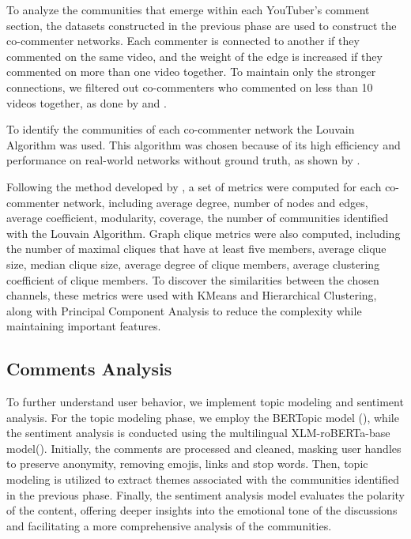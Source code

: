 \documentclass[12pt]{article}
\begin{document}
To analyze the communities that emerge within each YouTuber's comment section, the datasets constructed 
in the previous phase are used to construct the co-commenter networks. Each commenter is connected to
another if they commented on the same video, and the weight of the edge is increased if they commented
on more than one video together. To maintain only the stronger connections, we filtered out co-commenters
who commented on less than 10 videos together, as done by \cite{shajari2023} and \cite{kirdemir2023}. 

To identify the communities of each co-commenter network the Louvain Algorithm was used. This 
algorithm was chosen because of its high efficiency and performance on real-world networks
without ground truth, as shown by \cite{YOU2020104822}.

Following the method developed by \cite{kirdemir2023}, a set of metrics were computed 
for each co-commenter network, including average degree, number of nodes and edges, average coefficient,
modularity, coverage, the number of communities identified with the Louvain Algorithm. Graph clique 
metrics were also computed, including the number of maximal cliques that have at least five members, 
average clique size, median clique size, average degree of clique members, average clustering coefficient
of clique members. To discover the similarities between the chosen channels, these metrics were used
with KMeans and Hierarchical Clustering, along with Principal Component Analysis to reduce the complexity
while maintaining important features.

\subsection{Comments Analysis}

To further understand user behavior, we implement
topic modeling and sentiment analysis. For the topic modeling phase, we employ the BERTopic model 
(\cite{bertopic2022}), while the sentiment analysis is conducted using the multilingual 
XLM-roBERTa-base model(\cite{barbieri-etal-2022-xlm}). 
Initially, the comments are processed and cleaned, masking user handles to preserve anonymity,
removing emojis, links and stop words.
Then, topic modeling is utilized to extract themes associated with the communities identified in the 
previous phase. Finally, the sentiment analysis model evaluates the polarity of the content, 
offering deeper insights into the emotional tone of the discussions and facilitating a more 
comprehensive analysis of the communities.
\end{document}
